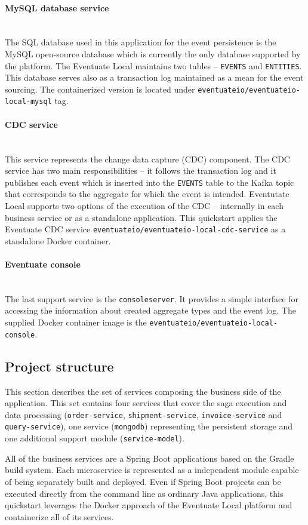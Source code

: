 \documentclass[oneside,
  digital, %
  table,   %
  nolof,     %
  nolot,     %
]{fithesis3}
\newcommand{\newlinepar}[1]{\paragraph{#1}\needspace{4\baselineskip}\mbox{}\\}
\begin{document}
\newlinepar{MySQL database service}

The SQL database used in this application for the event persistence is the MySQL open-source database which is currently the only database supported by the platform. The Eventuate Local maintains two tables -- \texttt{EVENTS} and \texttt{ENTITIES}. This database serves also as a transaction log maintained as a mean for the event sourcing. The containerized version is located under \texttt{eventuateio/eventuateio-local-mysql} tag.

\newlinepar{CDC service}

This service represents the change data capture (CDC) component. The CDC service has two main responsibilities -- it follows the transaction log and it publishes each event which is inserted into the \texttt{EVENTS} table to the Kafka topic that corresponds to the aggregate for which the event is intended. Eventutate Local supports two options of the execution of the CDC -- internally in each business service or as a standalone application. This quickstart applies the Eventuate CDC service \texttt{eventuateio/eventuateio-local-cdc-service} as a standalone Docker container.

\newlinepar{Eventuate console}

The last support service is the \texttt{consoleserver}. It provides a simple interface for accessing the information about created aggregate types and the event log. The supplied Docker container image is the \texttt{eventuateio/eventuateio-local-console}.


\subsection{Project structure}

This section describes the set of services composing the business side of the application. This set contains four services that cover the saga execution and data processing (\texttt{order-service}, \texttt{shipment-service}, \texttt{invoice-service} and \texttt{query-service}), one service (\texttt{mongodb}) representing the persistent storage and one additional support module (\texttt{service-model}).

All of the business services are a Spring Boot applications based on the Gradle \cite{gradle} build system. Each microservice is represented as a independent module capable of being separately built and deployed. Even if Spring Boot projects can be executed directly from the command line as ordinary Java applications, this quickstart leverages the Docker approach of the Eventuate Local platform and containerize all of its services.
\end{document}
